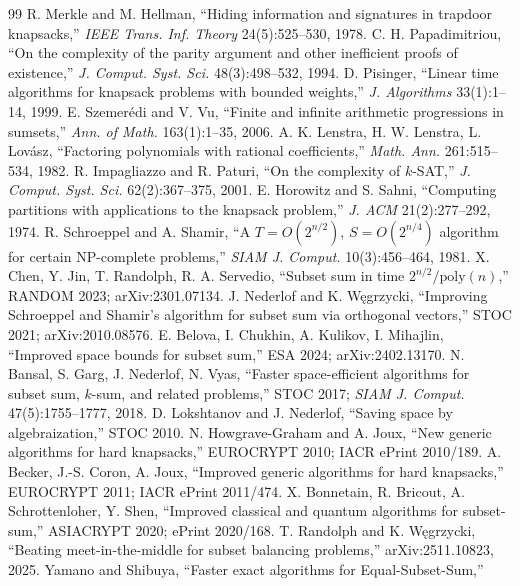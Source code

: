 \documentclass[11pt]{article}
\begin{document}
\begin{thebibliography}{99}
 R. Merkle and M. Hellman, ``Hiding information and signatures in
trapdoor knapsacks,'' \emph{IEEE Trans. Inf. Theory} 24(5):525--530, 1978.
 C. H. Papadimitriou, ``On the complexity of the parity argument
and other inefficient proofs of existence,'' \emph{J. Comput. Syst. Sci.}
48(3):498--532, 1994.
 D. Pisinger, ``Linear time algorithms for knapsack problems with
bounded weights,'' \emph{J. Algorithms} 33(1):1--14, 1999.
 E. Szemer\'edi and V. Vu, ``Finite and infinite arithmetic
progressions in sumsets,'' \emph{Ann. of Math.} 163(1):1--35, 2006.
 A. K. Lenstra, H. W. Lenstra, L. Lov\'asz, ``Factoring polynomials
with rational coefficients,'' \emph{Math. Ann.} 261:515--534, 1982.
 R. Impagliazzo and R. Paturi, ``On the complexity of $k$-SAT,''
\emph{J. Comput. Syst. Sci.} 62(2):367--375, 2001.
 E. Horowitz and S. Sahni, ``Computing partitions with applications
to the knapsack problem,'' \emph{J. ACM} 21(2):277--292, 1974.
 R. Schroeppel and A. Shamir, ``A $T=O(2^{n/2})$, $S=O(2^{n/4})$
algorithm for certain NP-complete problems,'' \emph{SIAM J. Comput.}
10(3):456--464, 1981.
 X. Chen, Y. Jin, T. Randolph, R. A. Servedio, ``Subset sum in
time $2^{n/2}/\mathrm{poly}(n)$,'' RANDOM 2023; arXiv:2301.07134.
 J. Nederlof and K. W\k{e}grzycki, ``Improving Schroeppel and
Shamir's algorithm for subset sum via orthogonal vectors,'' STOC 2021;
arXiv:2010.08576.
 E. Belova, I. Chukhin, A. Kulikov, I. Mihajlin, ``Improved space
bounds for subset sum,'' ESA 2024; arXiv:2402.13170.
 N. Bansal, S. Garg, J. Nederlof, N. Vyas, ``Faster space-efficient
algorithms for subset sum, $k$-sum, and related problems,'' STOC 2017;
\emph{SIAM J. Comput.} 47(5):1755--1777, 2018.
 D. Lokshtanov and J. Nederlof, ``Saving space by algebraization,''
STOC 2010.
 N. Howgrave-Graham and A. Joux, ``New generic algorithms for hard
knapsacks,'' EUROCRYPT 2010; IACR ePrint 2010/189.
 A. Becker, J.-S. Coron, A. Joux, ``Improved generic algorithms for
hard knapsacks,'' EUROCRYPT 2011; IACR ePrint 2011/474.
 X. Bonnetain, R. Bricout, A. Schrottenloher, Y. Shen, ``Improved
classical and quantum algorithms for subset-sum,'' ASIACRYPT 2020; ePrint
2020/168.
 T. Randolph and K. W\k{e}grzycki, ``Beating meet-in-the-middle for
subset balancing problems,'' arXiv:2511.10823, 2025.
 Yamano and Shibuya, ``Faster exact algorithms for Equal-Subset-Sum,''

\end{thebibliography}
\end{document}
